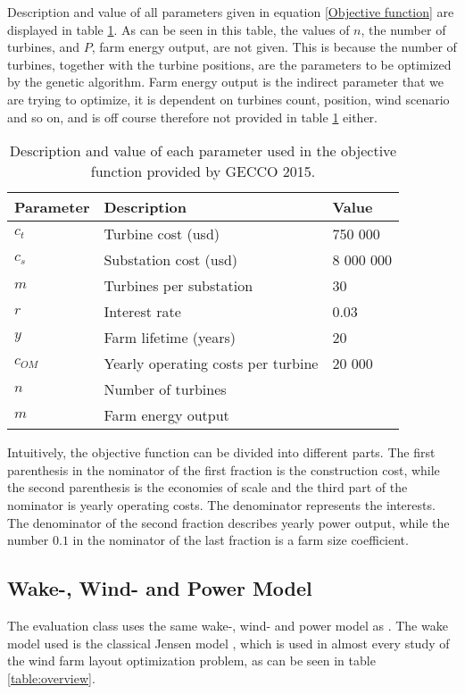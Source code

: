 \noindent Description and value of all parameters given in equation \ref{Objective function} are displayed in table \ref{Parameters}. As can be seen in this table, the values of $n$, the number of turbines, and $P$, farm energy output, are not given. This is because the number of turbines, together with the turbine positions, are the parameters to be optimized by the genetic algorithm. Farm energy output is the indirect parameter that we are trying to optimize, it is dependent on turbines count, position, wind scenario and so on, and is off course therefore not provided in table \ref{Parameters} either.\\


\begin{table}[h!]
\begin{center}
\caption{Description and value of each parameter used in the objective function provided by GECCO 2015.}
\label{Parameters}
\begin{tabular}{l|l|l}
\textbf{Parameter} & \textbf{Description} & \textbf{Value} \\ 
\hline 
$c_t$ & Turbine cost (usd) & 750 000 \\ 
$c_s$ & Substation cost (usd) & 8 000 000 \\ 
$m$ & Turbines per substation & 30 \\ 
$r$ & Interest rate & 0.03 \\ 
$y$ & Farm lifetime (years) & 20 \\ 
$c_{OM}$ & Yearly operating costs per turbine & 20 000 \\ 
$n$ & Number of turbines &  \\ 
$m$ & Farm energy output &  \\  
\end{tabular} 
\end{center}
\end{table}


\noindent Intuitively, the objective function can be divided into different parts. The first parenthesis in the nominator of the first fraction is the construction cost, while the second parenthesis is the economies of scale and the third part of the nominator is yearly operating costs. The denominator represents the interests. The denominator of the second fraction describes yearly power output, while the number $0.1$ in the nominator of the last fraction is a farm size coefficient. \\



\subsection{Wake-, Wind- and Power Model}\label{subsection:wakewindpower}
The evaluation class uses the same wake-, wind- and power model as \cite{Kusiak}. The wake model used is the classical Jensen model \citep{Jensen}, which is used in almost every study of the wind farm layout optimization problem, as can be seen in table \ref{table:overview}. \\

